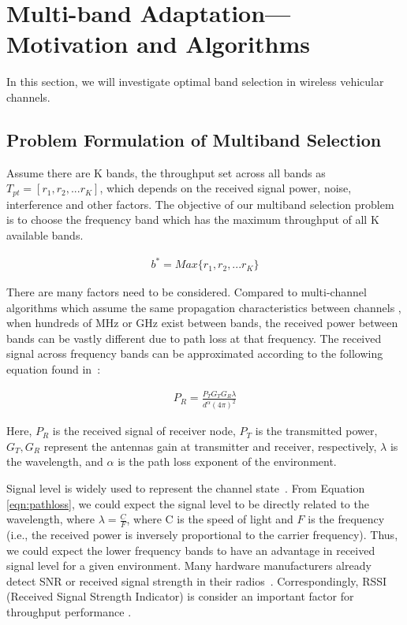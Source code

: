 \section{Multi-band Adaptation---Motivation and Algorithms}
\label{sec:model}

In this section, we will investigate optimal band selection in wireless vehicular channels. 

\subsection{Problem Formulation of Multiband Selection}
\label{subsec:problem}
Assume there are K bands, the throughput set across all bands as $T_{pt}=[r_1,r_2,...r_K]$, which depends on the received signal power, noise, interference and other factors. 
The objective of our multiband selection problem is to choose the frequency band which has the maximum throughput of all K available bands. 

\begin{align}
\label{eqn:max}
b^*=Max\{r_1,r_2,...r_K\}
\end{align}

There are many factors need to be considered.
Compared to multi-channel algorithms which assume the same propagation
characteristics between channels \cite{multichannel}, when hundreds of MHz or 
GHz exist between bands, the received power between bands can be vastly 
different due to path loss at that frequency.
The received signal across frequency bands can be approximated according to
the following equation found in~\cite{friis}:

\begin{align}
\label{eqn:pathloss}
P_{R}=\frac{P_TG_TG_R\lambda}{d^\alpha(4\pi)^2}
\end{align}

Here, $P_R$ is the received signal of receiver node, $P_T$ is the transmitted
power, $G_T,G_R$ represent the antennas gain at transmitter and receiver,
respectively, $\lambda$ is the wavelength, and $\alpha$ is the path loss 
exponent of the environment. 

Signal level is widely used to represent the channel 
state~\cite{rahul2009frequency}. From Equation \ref{eqn:pathloss},
we could expect the signal level to be directly related to the wavelength, 
where $\lambda=\frac{C}{F}$, where C is the speed of light and
$F$ is the frequency (i.e., the received power is inversely proportional 
to the carrier frequency).  Thus, we could expect the lower frequency bands 
to have an advantage in received signal level for a given environment.
Many hardware manufacturers already detect SNR or received signal 
strength in their radios~\cite{edalat2006measured}. Correspondingly,
RSSI (Received Signal Strength Indicator) is consider an important 
factor for throughput performance \cite{laneman2000energy,
laneman2001efficient}.  


